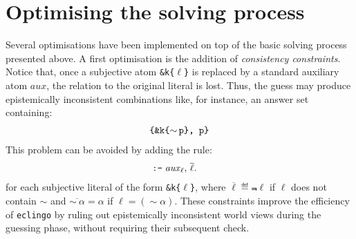 \documentclass{new_tlp}
\def\eclingo{{\tt eclingo}}
\def\clingo{{\tt clingo}}
\begin{document}
\section{Optimising the solving process}
\label{sec:optim}
Several optimisations have been implemented on top of the basic solving process presented above.
%
A first optimisation is the addition of \emph{consistency constraints}.
%
Notice that, once a subjective atom {\tt \&k\{$\ell$\}} is replaced by a standard auxiliary atom $\mathit{aux}$, the relation to the original literal is lost.
%
Thus, the guess may produce epistemically inconsistent combinations like, for instance, an answer set containing:
\begin{align*}
	\texttt{\{\&k\{$\sim$\,p\}, p\}}
\end{align*}
This problem can be avoided by adding the rule:
\begin{align*}
&\text{\texttt{:-}} \; \mathit{aux}_\ell,\, \overline{\ell}.
\end{align*}
%
for each subjective literal of the form {\tt \&k\{$\ell$\}}, where $\overline{\ell} \eqdef \Not \ell$ if $\ell$ does not contain $\sim$ and $\overline{\sim\ \alpha}=\alpha$ if $\ell = (\sim \alpha)$.
%
These constraints improve the efficiency of \eclingo{} by ruling out epistemically inconsistent world views during the guessing phase, without requiring their subsequent check.
\end{document}
